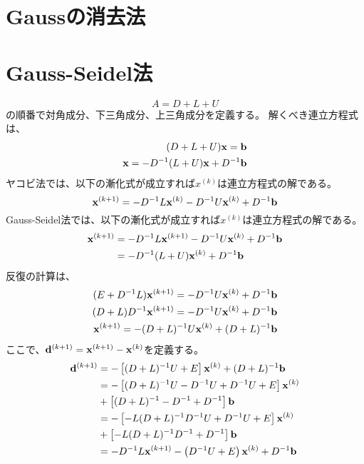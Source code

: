 \documentclass[twocolumn]{jsarticle}
\date{\today}
\author{山田龍}
\title{}
\newcommand{\kakko}[1][]{(#1)}
\newcommand{\bx}{\bold{x}}
\newcommand{\bb}{\bold{b}}
\newcommand{\bd}{\bold{d}}
\begin{document}
\maketitle
\section{Gaussの消去法}
\section{Gauss-Seidel法}
\begin{equation}
    A = D + L + U
\end{equation}
の順番で対角成分、下三角成分、上三角成分を定義する。
解くべき連立方程式は、
\begin{align}
  (D + L + U)\bx = \bb  \\
  \bx = -D^{-1}(L + U)\bx +  D^{-1} \bb 
\end{align}
ヤコビ法では、以下の漸化式が成立すれば$x^{\kakko[k]}$は連立方程式の解である。
\begin{equation}
    \bx^{\kakko[k+1]} = - D^{-1} L \bx^{\kakko[k]}\\
    - D^{-1} U \bx^{\kakko[k]} + D^{-1}\bold{b} 
\end{equation}
Gauss-Seidel法では、以下の漸化式が成立すれば$x^{\kakko[k]}$は連立方程式の解である。
\begin{align}
    \bx^{\kakko[k+1]} &= - D^{-1} L \bx^{\kakko[k+1]}
    - D^{-1} U \bx^{\kakko[k]} + D^{-1}\bold{b}\\
    &=- D^{-1} (L + U) \bx^{\kakko[k]} + D^{-1}\bold{b} 
\end{align}
反復の計算は、
\begin{align*}
    (E + D^{-1}L)\bx^{\kakko[k+1]} = - D^{-1} U \bx^{\kakko[k]} + D^{-1}\bold{b}\\
    (D + L)D^{-1}\bx^{\kakko[k+1]} = - D^{-1} U \bx^{\kakko[k]} + D^{-1}\bold{b}\\
    \bx^{\kakko[k+1]} = - (D + L)^{-1}U \bx^{\kakko[k]} +(D + L)^{-1}\bold{b}\\
\end{align*}
ここで、$\bd^{\kakko[k+1]} = \bx^{\kakko[k+1]} - \bx^{\kakko[k]}$を定義する。
\begin{align*}
  \bd^{\kakko[k+1]} &= - \left[ (D + L)^{-1}U + E\right] \bx^{\kakko[k]} + (D + L)^{-1}\bb\\
  &= - \left[ (D + L)^{-1}U - D^{-1}U + D^{-1}U+ E\right] \bx^{\kakko[k]}\\
  &+ \left[(D + L)^{-1} - D^{-1} + D^{-1}\right]\bb\\
  &= - \left[ - L(D + L)^{-1}D^{-1}U + D^{-1}U+ E\right] \bx^{\kakko[k]}\\
  &+ \left[- L(D + L)^{-1}D^{-1}+ D^{-1}\right]\bb\\
  &= - D^{-1}L \bx^{\kakko[k+1]}- \left( D^{-1}U+ E\right) \bx^{\kakko[k]} + D^{-1}\bb
\end{align*}
\end{document}
